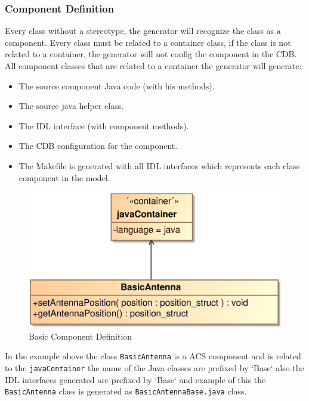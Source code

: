 \subsubsection{Component Definition}
Every class without a stereotype, the generator will recognize the class as a
component. Every class must be related to a container class, if the class is not
related to a container, the generator will not config the component in the CDB.
All component classes that are related to a container the generator will
generate:
\begin{itemize}
	\item The source component Java code (with his methods).
	\item The source java helper class.
	\item The IDL interface (with component methods).
	\item The CDB configuration for the component.
	\item The Makefile is generated with all IDL interfaces which represents each
	class component in the model.
\end{itemize}

 \begin{figure}[h!t]
\begin{center}
\includegraphics[scale=0.4]{images/basiccomponent}
\caption{\label{fig:vs_diag}Basic Component Definition}
\end{center}
\end{figure} 

In the example above the class  \verb+BasicAntenna+ is a ACS component and is
related to the  \verb+javaContainer+ the name of the Java classes are prefixed
by `Base` also the IDL interfaces generated are prefixed by `Base` and example
of this the \verb+BasicAntenna+ class is generated as
\verb+BasicAntennaBase.java+ class.


